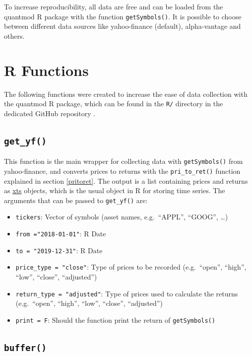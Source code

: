 \documentclass[
  oneside, a4paper, 12pt, openany]{book}
\providecommand{\tightlist}{%
  \setlength{\itemsep}{0pt}\setlength{\parskip}{0pt}}
\theoremstyle{definition}
\theoremstyle{definition}
\theoremstyle{definition}
\theoremstyle{definition}
\theoremstyle{remark}
\begin{document}
To increase reproducibility, all data are free and can be loaded from the quantmod R package with the function \texttt{getSymbols()}. It is possible to choose between different data sources like yahoo-finance (default), alpha-vantage and others.

\hypertarget{r-functions-1}{%
\section{R Functions}\label{r-functions-1}}

The following functions were created to increase the ease of data collection with the quantmod R package, which can be found in the \texttt{R/} directory in the dedicated GitHub repository \citep{GitHub}.

\hypertarget{get_yf}{%
\subsection{\texorpdfstring{\texttt{get\_yf()}}{get\_yf()}}\label{get_yf}}

This function is the main wrapper for collecting data with \texttt{getSymbols()} from yahoo-finance, and converts prices to returns with the \texttt{pri\_to\_ret()} function explained in section \ref{pritoret}. The output is a list containing prices and returns as \href{https://cran.r-project.org/web/packages/xts/xts.pdf}{xts} objects, which is the usual object in R for storing time series. The arguments that can be passed to \texttt{get\_yf()} are:

\begin{itemize}
\tightlist
\item
  \texttt{tickers}: Vector of symbols (asset names, e.g.~``APPL'', ``GOOG'', \ldots)
\item
  \texttt{from\ ="2018-01-01"}: R Date
\item
  \texttt{to\ =\ "2019-12-31"}: R Date
\item
  \texttt{price\_type\ =\ "close"}: Type of prices to be recorded (e.g.~``open'', ``high'', ``low'', ``close'', ``adjusted'')
\item
  \texttt{return\_type\ =\ "adjusted"}: Type of prices used to calculate the returns (e.g.~``open'', ``high'', ``low'', ``close'', ``adjusted'')
\item
  \texttt{print\ =\ F}: Should the function print the return of \texttt{getSymbols()}
\end{itemize}

\hypertarget{buffer}{%
\subsection{\texorpdfstring{\texttt{buffer()}}{buffer()}}\label{buffer}}
\end{document}
